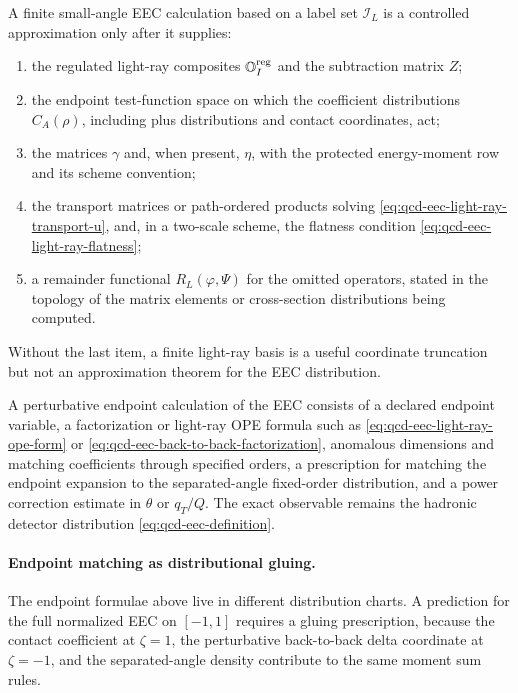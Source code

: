 \begin{controlledapproximation}
\label{ca:qcd-eec-finite-light-ray-mixing-truncation}
A finite small-angle EEC calculation based on a label set \(\mathcal I_L\)
is a controlled approximation only after it supplies:
\begin{enumerate}
  \item the regulated light-ray composites
  \(\mathbb O_I^{\rm reg}\) and the subtraction matrix \(Z\);
  \item the endpoint test-function space on which the coefficient
  distributions \(C_A(\rho)\), including plus distributions and contact
  coordinates, act;
  \item the matrices \(\gamma\) and, when present, \(\eta\), with the
  protected energy-moment row and its scheme convention;
  \item the transport matrices or path-ordered products solving
  \eqref{eq:qcd-eec-light-ray-transport-u}, and, in a two-scale scheme, the
  flatness condition \eqref{eq:qcd-eec-light-ray-flatness};
  \item a remainder functional \(R_L(\varphi,\Psi)\) for the omitted
  operators, stated in the topology of the matrix elements or cross-section
  distributions being computed.
\end{enumerate}
Without the last item, a finite light-ray basis is a useful coordinate
truncation but not an approximation theorem for the EEC distribution.
\end{controlledapproximation}

\begin{controlledapproximation}
\label{ca:qcd-eec-endpoint-calculations}
A perturbative endpoint calculation of the EEC consists of a declared
endpoint variable, a factorization or light-ray OPE formula such as
\eqref{eq:qcd-eec-light-ray-ope-form} or
\eqref{eq:qcd-eec-back-to-back-factorization}, anomalous dimensions and
matching coefficients through specified orders, a prescription for matching
the endpoint expansion to the separated-angle fixed-order distribution, and a
power correction estimate in \(\theta\) or \(q_T/Q\).  The exact observable
remains the hadronic detector distribution
\eqref{eq:qcd-eec-definition}.
\end{controlledapproximation}

\paragraph{Endpoint matching as distributional gluing.}
The endpoint formulae above live in different distribution charts.  A
prediction for the full normalized EEC on \([-1,1]\) requires a gluing prescription,
because the contact coefficient at \(\zeta=1\), the perturbative
back-to-back delta coordinate at \(\zeta=-1\), and the separated-angle
density contribute to the same moment sum rules.

